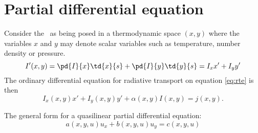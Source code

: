 \section{\label{sec:PDE}Partial differential equation}

Consider the \rte{} \  as being posed in a thermodynamic space $(x,y)$ where the variables $x$ and $y$ may denote scalar variables such as temperature, number density or pressure.
\begin{equation}
  I'(x,y) = \pd{I}{x} \td{x}{s} + \pd{I}{y} \td{y}{s} = I_{x}x' + I_{y}y'
\end{equation}
The ordinary differential equation for radiative transport on equation \eqref{eq:rte} is then
\begin{equation}
  I_{x}(x,y)x' + I_{y}(x,y)y' + \alpha (x,y) I(x,y) = j(x,y) .
  \label{eq:rtepde}
\end{equation}

The general form\cite{Pinchover2005, John1982, Guenther1996} for a quasilinear partial differential equation:
\begin{equation}
  a(x,y,u) u_{x} + b(x,y,u) u_{y} = c(x,y,u)	
\end{equation}

%

\endinput %